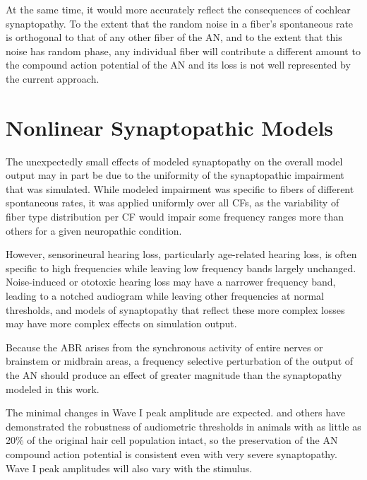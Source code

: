 At the same time, it would more accurately reflect the consequences of cochlear synaptopathy.  To the extent that the random noise in a fiber's spontaneous rate is orthogonal to that of any other fiber of the AN, and to the extent that this noise has random phase, any individual fiber will contribute a different amount to the compound action potential of the AN and its loss is not well represented by the current approach.  

\section{Nonlinear Synaptopathic Models} %
\label{sec:nonlinear_synaptopathic_models}
The unexpectedly small effects of modeled synaptopathy on the overall model output may in part be due to the uniformity of the synaptopathic impairment that was simulated.  While modeled impairment was specific to fibers of different spontaneous rates, it was applied uniformly over all CFs, as the variability of fiber type distribution per CF would impair some frequency ranges more than others for a given neuropathic condition. 

However, sensorineural hearing loss, particularly age-related hearing loss, is often specific to high frequencies while leaving low frequency bands largely unchanged.   Noise-induced or ototoxic hearing loss may have a narrower frequency band, leading to a notched audiogram while leaving other frequencies at normal thresholds, and models of synaptopathy that reflect these more complex losses may have more complex effects on simulation output.

Because the ABR arises from the synchronous activity of entire nerves or brainstem or midbrain areas, a frequency selective perturbation of the output of the AN should produce an effect of greater magnitude than the synaptopathy modeled in this work. 

The minimal changes in Wave I peak amplitude are expected.
\cite{Liberman2014Efferent} and others have demonstrated the robustness of audiometric thresholds in animals with as little as 20\% of the original hair cell population intact, so the preservation of the AN compound action potential is consistent even with very severe synaptopathy.  Wave I peak amplitudes will also vary with the stimulus.  
